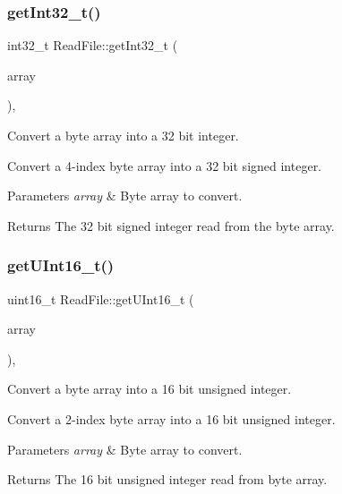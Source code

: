 \subsubsection{\texorpdfstring{get\+Int32\+\_\+t()}{getInt32\_t()}}
{\footnotesize\ttfamily int32\+\_\+t Read\+File\+::get\+Int32\+\_\+t (\begin{DoxyParamCaption}\item[{Q\+Byte\+Array $\ast$}]{array }\end{DoxyParamCaption})\hspace{0.3cm}{\ttfamily [static]}, {\ttfamily [private]}}



Convert a byte array into a 32 bit integer. 

Convert a 4-\/index byte array into a 32 bit signed integer. 
\begin{DoxyParams}{Parameters}
{\em array} & Byte array to convert. \\
\hline
\end{DoxyParams}
\begin{DoxyReturn}{Returns}
The 32 bit signed integer read from the byte array. 
\end{DoxyReturn}
\mbox{\label{class_read_file_a4c16589205bf83c1cb2ca9e96cac7c1f}} 
\subsubsection{\texorpdfstring{get\+U\+Int16\+\_\+t()}{getUInt16\_t()}}
{\footnotesize\ttfamily uint16\+\_\+t Read\+File\+::get\+U\+Int16\+\_\+t (\begin{DoxyParamCaption}\item[{Q\+Byte\+Array $\ast$}]{array }\end{DoxyParamCaption})\hspace{0.3cm}{\ttfamily [static]}, {\ttfamily [private]}}



Convert a byte array into a 16 bit unsigned integer. 

Convert a 2-\/index byte array into a 16 bit unsigned integer. 
\begin{DoxyParams}{Parameters}
{\em array} & Byte array to convert. \\
\hline
\end{DoxyParams}
\begin{DoxyReturn}{Returns}
The 16 bit unsigned integer read from byte array. 
\end{DoxyReturn}
\mbox{\label{class_read_file_a2eebe441e894e6ad4d79e05d3fc6f403}} 
